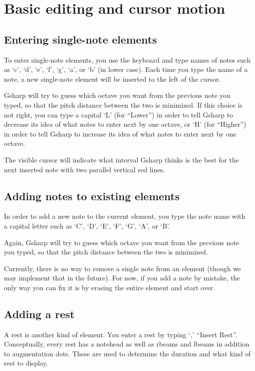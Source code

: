 \documentclass[11pt]{book}
\def\gs{Gsharp}
\def\kbd#1{`#1'}
\def\command#1{``#1''}
\begin{document}
\chapter{Basic editing and cursor motion}

\section{Entering single-note elements}

To enter single-note elements, you use the keyboard and type names of
notes such as \kbd{c}, \kbd{d}, \kbd{e}, \kbd{f}, \kbd{g}, \kbd{a}, or
\kbd{b} (in lower case).  Each time you type the name of a note, a new
single-note element will be inserted to the left of the cursor.

{\gs} will try to guess which octave you want from the previous note
you typed, so that the pitch distance between the two is minimized.
If this choice is not right, you can type a capital \kbd{L} (for
\command{Lower}) in order to tell {\gs} to decrease its idea of what
notes to enter next by one octave, or \kbd{H} (for \command{Higher})
in order to tell {\gs} to increase its idea of what notes to enter
next by one octave.

The visible cursor will indicate what interval {\gs} thinks is the
best for the next inserted note with two parallel vertical red lines. 

\section{Adding notes to existing elements}

In order to add a new note to the current element, you type the note
name with a capital letter such as \kbd{C}, \kbd{D}, \kbd{E}, \kbd{F},
\kbd{G}, \kbd{A}, or \kbd{B}.

Again, {\gs} will try to guess which octave you want from the previous
note you typed, so that the pitch distance between the two is
minimized.

Currently, there is no way to remove a single note from an element
(though we may implement that in the future).  For now, if you add a
note by mistake, the only way you can fix it is by erasing the entire
element and start over. 

\section{Adding a rest}

A rest is another kind of element.  You enter a rest by typing \kbd{,}
\command{Insert Rest}.  Conceptually, every rest has a notehead as
well as rbeams and lbeams in addition to augmentation dots.  These are
used to determine the duration and what kind of rest to display.
\end{document}
